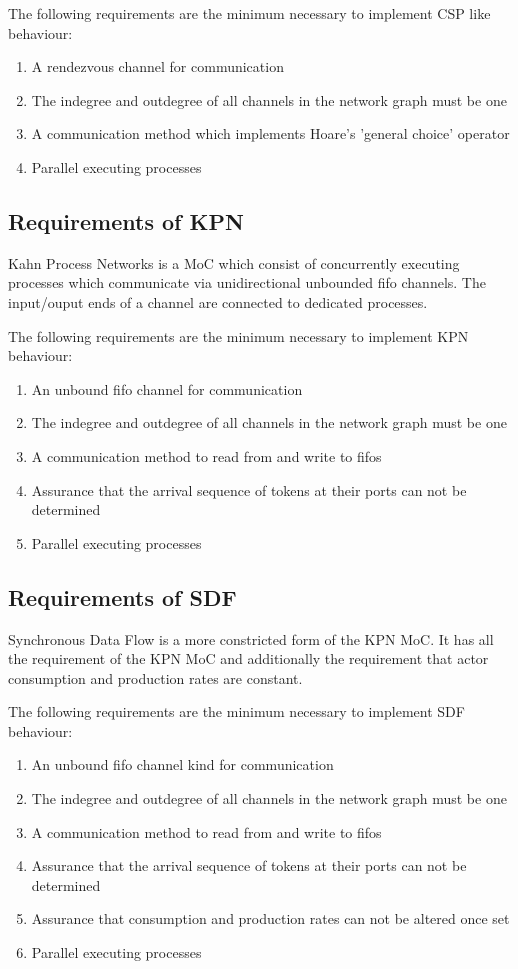 The following requirements are the minimum necessary to
implement CSP like behaviour:

\begin{enumerate}
\item A rendezvous channel for communication
\item The indegree and outdegree of all channels in the network graph must be one
\item A communication method which implements Hoare's 'general choice' operator
\item Parallel executing processes
\end{enumerate}

\subsection{Requirements of KPN}
Kahn Process Networks \cite{kahn:1974}
is a MoC which consist of concurrently executing processes
which communicate via unidirectional unbounded fifo channels.
The input/ouput ends of a channel are connected to dedicated
processes.

The following requirements are the minimum necessary to
implement KPN behaviour:

\begin{enumerate}
\item An unbound fifo channel for communication
\item The indegree and outdegree of all channels in the network graph must be one
\item A communication method to read from and write to fifos
\item Assurance that the arrival sequence of tokens at
      their ports can not be determined
\item Parallel executing processes
\end{enumerate}

\subsection{Requirements of SDF}
Synchronous Data Flow \cite{sdf:xxx}
is a more constricted form of the KPN MoC.
It has all the requirement of the KPN MoC and
additionally the requirement that actor consumption and
production rates are constant.

The following requirements are the minimum necessary to
implement SDF behaviour:

\begin{enumerate}
\item An unbound fifo channel kind for communication
\item The indegree and outdegree of all channels in the network graph must be one
\item A communication method to read from and write to fifos
\item Assurance that the arrival sequence of tokens at
      their ports can not be determined
\item Assurance that consumption and production rates can not
      be altered once set
\item Parallel executing processes
\end{enumerate}

